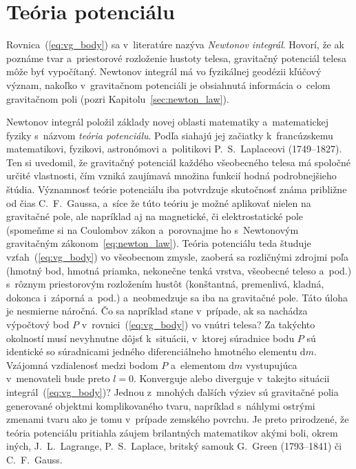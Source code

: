 \documentclass[a4paper,12pt]{book}
\newcommand{\diff}{\mathrm d}
\begin{document}
\section{Teória potenciálu}
\label{sec:potential_theory}

Rovnica~(\ref{eq:vg_body}) sa v~literatúre nazýva \emph{Newtonov
integrál}.  Hovorí, že ak poznáme tvar a~priestorové rozloženie hustoty telesa,
gravitačný potenciál telesa môže byť vypočítaný.  Newtonov
integrál má vo fyzikálnej geodézii kľúčový význam, nakoľko v~gravitačnom
potenciáli je obsiahnutá informácia o~celom gravitačnom poli (pozri
Kapitolu~\ref{sec:newton_law}).

Newtonov integrál položil základy novej oblasti matematiky a~matematickej 
fyziky s~názvom \emph{teória potenciálu}.  Podľa \textcite{MacMillan1930} 
siahajú jej začiatky k~francúzskemu matematikovi, fyzikovi, astronómovi 
a~politikovi P.~S.~Laplaceovi (1749--1827).  Ten si uvedomil, že gravitačný 
potenciál každého všeobecného telesa má spoločné určité vlastnosti, čím vzniká 
zaujímavá množina funkcií hodná podrobnejšieho štúdia.  Významnosť teórie 
potenciálu iba potvrdzuje skutočnosť známa približne od čias C.~F.~Gaussa, 
a~síce že túto teóriu je možné aplikovať nielen na gravitačné pole, ale 
napríklad aj na magnetické, či elektrostatické pole (spomeňme si na Coulombov 
zákon a~porovnajme ho s~Newtonovým gravitačným zákonom~\ref{eq:newton_law}).  
Teória potenciálu teda študuje vzťah~(\ref{eq:vg_body}) vo všeobecnom zmysle, 
zaoberá sa rozličnými zdrojmi poľa (hmotný bod, hmotná priamka, nekonečne tenká 
vrstva, všeobecné teleso a~pod.) s~rôznym priestorovým rozložením hustôt 
(konštantná, premenlivá, kladná, dokonca i~záporná a~pod.) a~neobmedzuje sa iba 
na gravitačné pole.  Táto úloha je nesmierne náročná.  Čo sa napríklad stane 
v~prípade, ak sa nachádza výpočtový bod $P$ v~rovnici~(\ref{eq:vg_body}) vo 
vnútri telesa?  Za takýchto okolností musí nevyhnutne dôjsť k~situácii, 
v~ktorej súradnice bodu $P$ sú identické so súradnicami jedného diferenciálneho 
hmotného elementu $\diff m$.  Vzájomná vzdialenosť medzi bodom $P$ a~elementom 
$\diff m$ vystupujúca v~menovateli bude preto $l = 0$.  Konverguje alebo 
diverguje v~takejto situácii integrál~(\ref{eq:vg_body})?  Jednou z~mnohých 
ďalších výziev sú gravitačné polia generované objektmi komplikovaného tvaru, 
napríklad s~náhlymi ostrými zmenami tvaru ako je tomu v~prípade zemského 
povrchu.  Je preto prirodzené, že teória potenciálu pritiahla záujem 
brilantných matematikov akými boli, okrem iných, J.~L.~Lagrange, P.~S.~Laplace, 
britský samouk G.~Green (1793--1841) či C.~F.~Gauss.
\end{document}
